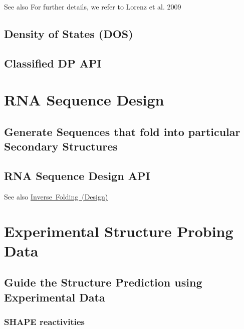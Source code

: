 \begin{DoxySeeAlso}{See also}
For further details, we refer to Lorenz et al. 2009 \cite{lorenz:2009}
\end{DoxySeeAlso}
\hypertarget{classified_dp_density_of_states}{}\subsection{Density of States (\+D\+O\+S)}\label{classified_dp_density_of_states}
\hypertarget{classified_dp_classified_dp_api}{}\subsection{Classified D\+P A\+PI}\label{classified_dp_classified_dp_api}
 \hypertarget{design}{}\section{R\+NA Sequence Design}\label{design}
\hypertarget{design_design_intro}{}\subsection{Generate Sequences that fold into particular Secondary Structures}\label{design_design_intro}
\hypertarget{design_design_api}{}\subsection{R\+N\+A Sequence Design A\+PI}\label{design_design_api}
\begin{DoxySeeAlso}{See also}
\mbox{\hyperlink{group__inverse__fold}{Inverse Folding (Design)}}
\end{DoxySeeAlso}
 \hypertarget{structure_probing_data}{}\section{Experimental Structure Probing Data}\label{structure_probing_data}
\hypertarget{structure_probing_data_structure_probing_intro}{}\subsection{Guide the Structure Prediction using Experimental Data}\label{structure_probing_data_structure_probing_intro}
\hypertarget{structure_probing_data_structure_probing_SHAPE}{}\subsubsection{S\+H\+A\+P\+E reactivities}\label{structure_probing_data_structure_probing_SHAPE}
